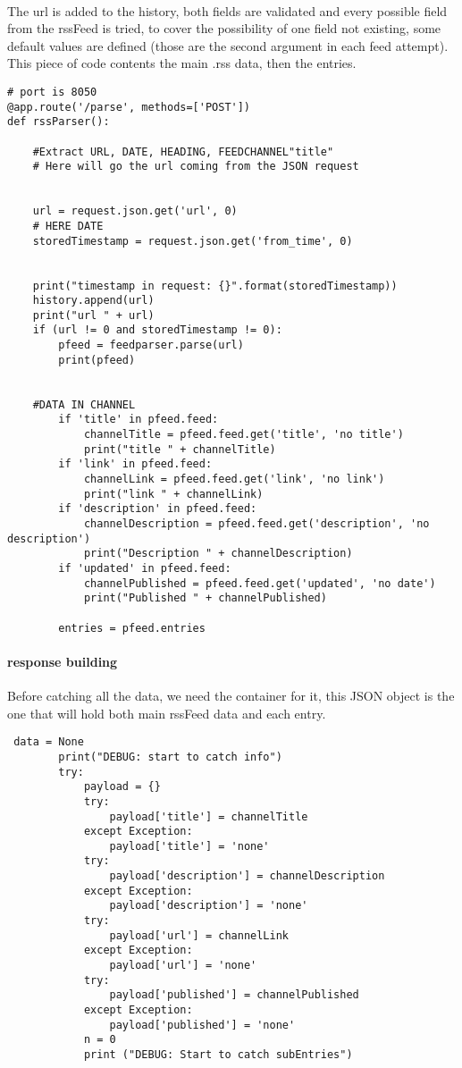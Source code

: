 \documentclass{article}
\begin{document}
\paragraph{}
The url is added to the history, both fields are validated and every possible field from the rssFeed is tried, to cover the possibility of one field not existing, some default values are defined (those are the second argument in each feed attempt).
This piece of code contents the main .rss data, then the entries.
\begin{lstlisting}
# port is 8050
@app.route('/parse', methods=['POST'])
def rssParser():

    #Extract URL, DATE, HEADING, FEEDCHANNEL"title"
    # Here will go the url coming from the JSON request


    url = request.json.get('url', 0)
    # HERE DATE
    storedTimestamp = request.json.get('from_time', 0)


    print("timestamp in request: {}".format(storedTimestamp))
    history.append(url)
    print("url " + url)
    if (url != 0 and storedTimestamp != 0):
        pfeed = feedparser.parse(url)
        print(pfeed)


    #DATA IN CHANNEL
        if 'title' in pfeed.feed:
            channelTitle = pfeed.feed.get('title', 'no title')
            print("title " + channelTitle)
        if 'link' in pfeed.feed:
            channelLink = pfeed.feed.get('link', 'no link')
            print("link " + channelLink)
        if 'description' in pfeed.feed:
            channelDescription = pfeed.feed.get('description', 'no description')
            print("Description " + channelDescription)
        if 'updated' in pfeed.feed:
            channelPublished = pfeed.feed.get('updated', 'no date')
            print("Published " + channelPublished)

        entries = pfeed.entries
\end{lstlisting}

\paragraph{response building}
Before catching all the data, we need the container for it, this JSON object is the one that will hold both main rssFeed data and each entry.
\begin{lstlisting}
 data = None
        print("DEBUG: start to catch info")
        try:
            payload = {}
            try:
                payload['title'] = channelTitle
            except Exception:
                payload['title'] = 'none'
            try:
                payload['description'] = channelDescription
            except Exception:
                payload['description'] = 'none'
            try:
                payload['url'] = channelLink
            except Exception:
                payload['url'] = 'none'
            try:
                payload['published'] = channelPublished
            except Exception:
                payload['published'] = 'none'
            n = 0
            print ("DEBUG: Start to catch subEntries")
\end{lstlisting}
\end{document}
